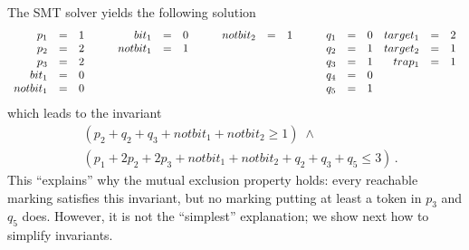The SMT solver yields the following solution
$$
\begin{array}[t]{rcl}
  p_1      & = & 1 \\
  p_2      & = & 2 \\
  p_3      & = & 2 \\
  bit_1    & = & 0 \\
  notbit_1 & = & 0
\end{array}
\qquad
\begin{array}[t]{rcl}
  bit_1    & = & 0 \\
  notbit_1 & = & 1
\end{array}
\qquad
\begin{array}[t]{rcl}
  notbit_2 & = & 1
\end{array}
\qquad
\begin{array}[t]{rcl}
  q_1   & = & 0 \\
  q_2   & = & 1 \\
  q_3   & = & 1 \\
  q_4   & = & 0 \\
  q_5   & = & 1 \\
\end{array}
\begin{array}[t]{rcl}
  target_1 & = & 2 \\
  target_2 & = & 1 \\
  trap_1   & = & 1
\end{array}
$$
\noindent which leads to the invariant
\begin{align}\label{eq:invariant}
& (p_2 + q_2 + q_3 + notbit_1 + notbit_2 \ge 1 ) \; \land \nonumber \\
& (p_1 + 2 p_2 + 2 p_3 + notbit_1 + notbit_2 + q_2 + q_3 + q_5 \le 3)\,.
\end{align}
\noindent This ``explains'' why the mutual exclusion property holds: every
reachable marking satisfies this invariant, but no marking putting at least 
a token in $p_3$ and $q_5$ does. 
However, it is not the ``simplest'' explanation; we show next how to simplify invariants.


% 


